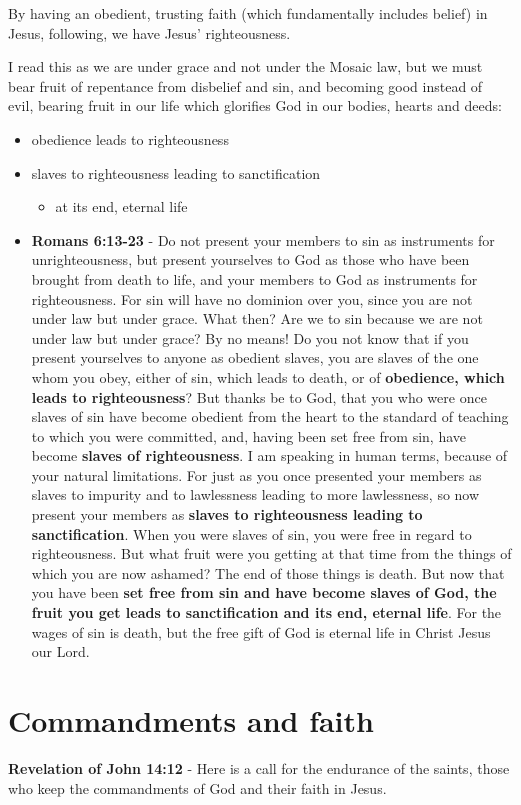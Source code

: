 \documentclass[11pt]{article}
\begin{document}
By having an obedient, trusting faith (which fundamentally includes belief) in Jesus, following, we have Jesus' righteousness.

I read this as we are under grace and not
under the Mosaic law, but we must bear fruit
of repentance from disbelief and sin, and
becoming good instead of evil, bearing fruit
in our life which glorifies God in our bodies,
hearts and deeds:
\begin{itemize}
\item obedience leads to righteousness
\item slaves to righteousness leading to sanctification
\begin{itemize}
\item at its end, eternal life
\end{itemize}

\item \textbf{Romans 6:13-23} - Do not present your members to sin as instruments for unrighteousness, but present yourselves to God as those who have been brought from death to life, and your members to God as instruments for righteousness.  For sin will have no dominion over you, since you are not under law but under grace.  What then? Are we to sin because we are not under law but under grace? By no means!  Do you not know that if you present yourselves to anyone as obedient slaves, you are slaves of the one whom you obey, either of sin, which leads to death, or of \textbf{obedience, which leads to righteousness}?  But thanks be to God, that you who were once slaves of sin have become obedient from the heart to the standard of teaching to which you were committed, and, having been set free from sin, have become \textbf{slaves of righteousness}.  I am speaking in human terms, because of your natural limitations. For just as you once presented your members as slaves to impurity and to lawlessness leading to more lawlessness, so now present your members as \textbf{slaves to righteousness leading to sanctification}.  When you were slaves of sin, you were free in regard to righteousness.  But what fruit were you getting at that time from the things of which you are now ashamed? The end of those things is death.  But now that you have been \textbf{set free from sin and have become slaves of God, the fruit you get leads to sanctification and its end, eternal life}.  For the wages of sin is death, but the free gift of God is eternal life in Christ Jesus our Lord.
\end{itemize}

\section{Commandments and faith}
\label{sec:org9bb89f7}
\textbf{Revelation of John 14:12} - Here is a call for the endurance of the saints, those who keep the commandments of God and their faith in Jesus.
\end{document}
